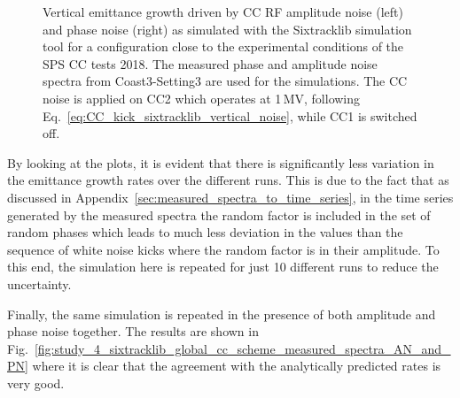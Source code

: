 \begin{figure}[htp]
\begin{subfigure}{.45\textwidth}
    \end{subfigure}
    \caption{Vertical emittance growth driven by CC RF amplitude noise (left) and phase noise (right) as simulated with the Sixtracklib simulation tool for a configuration close to the experimental conditions of the SPS CC tests 2018. The measured phase and amplitude noise spectra from Coast3-Setting3 are used for the simulations. The CC noise is applied on CC2 which operates at 1\,MV, following Eq.~\eqref{eq:CC_kick_sixtracklib_vertical_noise}, while CC1 is switched off.}
    \label{fig:study_4_sixtracklib_global_cc_scheme_measured_spectra}
\end{figure}

By looking at the plots, it is evident that there is significantly less variation in the emittance growth rates over the different runs. This is due to the fact that as discussed in Appendix~\ref{sec:measured_spectra_to_time_series}, in the time series generated by the measured spectra the random factor is included in the set of random phases which leads to much less deviation in the values than the sequence of white noise kicks where the random factor is in their amplitude. To this end, the simulation here is repeated for just 10 different runs to reduce the uncertainty.

Finally, the same simulation is repeated in the presence of both amplitude and phase noise together. The results are shown in Fig.~\ref{fig:study_4_sixtracklib_global_cc_scheme_measured_spectra_AN_and_PN} where it is clear that the agreement with the analytically predicted rates is very good. 

